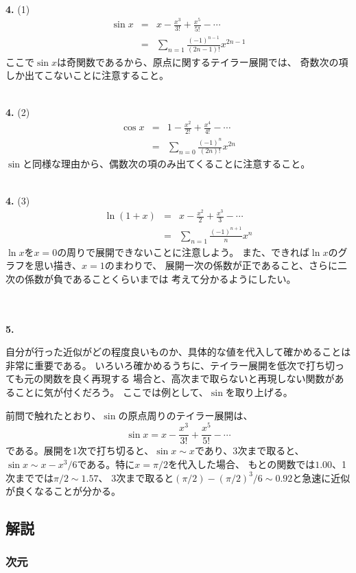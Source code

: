 \documentclass{jarticle}
\newcommand{\ans}[2]{\noindent\\ {\bf \large #1.} (#2)}
\newcommand{\Ans}[1]{\noindent\\ {\bf \large #1.} }
\begin{document}
\ans{4}{1}
\begin{eqnarray}
  \sin x &=& x - \frac{x^3}{3!} + \frac{x^5}{5!} - \cdots \\
  &=& \sum_{n=1} \frac{(-1)^{n-1}}{(2n-1)!} x^{2n-1}
\end{eqnarray}
ここで$\sin x$は奇関数であるから、原点に関するテイラー展開では、
奇数次の項しか出てこないことに注意すること。

\ans{4}{2}
\begin{eqnarray}
  \cos x &=& 1 - \frac{x^2}{2!} + \frac{x^4}{4!} - \cdots \\
  &=& \sum_{n=0} \frac{(-1)^{n}}{(2n)!} x^{2n}
\end{eqnarray}
$\sin$と同様な理由から、偶数次の項のみ出てくることに注意すること。

\ans{4}{3}
\begin{eqnarray}
  \ln (1+x) &=& x - \frac{x^2}{2} +  \frac{x^3}{3} - \cdots\\
  &=& \sum_{n=1} \frac{(-1)^{n+1}}{n}x^n
\end{eqnarray}
$\ln x$を$x=0$の周りで展開できないことに注意しよう。
また、できれば$\ln x$のグラフを思い描き、$x=1$のまわりで、
展開一次の係数が正であること、さらに二次の係数が負であることくらいまでは
考えて分かるようにしたい。

\noindent\\
\Ans{5}

自分が行った近似がどの程度良いものか、具体的な値を代入して確かめることは非常に重要である。
いろいろ確かめるうちに、テイラー展開を低次で打ち切っても元の関数を良く再現する
場合と、高次まで取らないと再現しない関数があることに気が付くだろう。
ここでは例として、$\sin$を取り上げる。

前問で触れたとおり、$\sin$の原点周りのテイラー展開は、
\begin{equation}
  \sin x = x - \frac{x^3}{3!} + \frac{x^5}{5!} - \cdots
\end{equation}
である。展開を1次で打ち切ると、$\sin x \sim x$であり、3次まで取ると、
$\sin x \sim x - x^3/6$である。特に$x=\pi/2$を代入した場合、
もとの関数では$1.00$、1次まででは$\pi/2 \sim 1.57$、
3次まで取ると$(\pi/2) - (\pi/2)^3/6 \sim 0.92$と急速に近似が良くなることが分かる。

\subsection{解説}

\subsubsection{次元}
\end{document}
